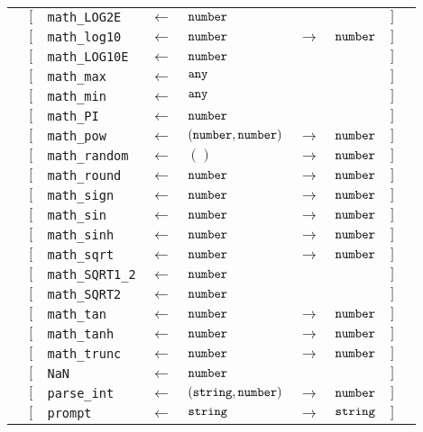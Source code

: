 \begin{tabular}[fragile]{lllllllll}
& $[$ & \texttt{math\_LOG2E} & $\leftarrow$  & $\texttt{number}$ & & & $]$ \\
& $[$ & \texttt{math\_log10} & $\leftarrow$  & $\texttt{number}$ & $\rightarrow$ & $\texttt{number}$ & $]$ \\
& $[$ & \texttt{math\_LOG10E} & $\leftarrow$  & $\texttt{number}$ & & & $]$ \\
& $[$ & \texttt{math\_max} & $\leftarrow$  & $\texttt{any}$ & & & $]$ \\
& $[$ & \texttt{math\_min} & $\leftarrow$  & $\texttt{any}$ & & & $]$ \\
& $[$ & \texttt{math\_PI} & $\leftarrow$  & $\texttt{number}$ & & & $]$ \\
& $[$ & \texttt{math\_pow} & $\leftarrow$  & $(\texttt{number}, \texttt{number})$ & $\rightarrow$ & $\texttt{number}$ & $]$ \\
& $[$ & \texttt{math\_random} & $\leftarrow$  & $()$ & $\rightarrow$ & $\texttt{number}$ & $]$ \\
& $[$ & \texttt{math\_round} & $\leftarrow$  & $\texttt{number}$ & $\rightarrow$ & $\texttt{number}$ & $]$ \\
& $[$ & \texttt{math\_sign} & $\leftarrow$  & $\texttt{number}$ & $\rightarrow$ & $\texttt{number}$ & $]$ \\
& $[$ & \texttt{math\_sin} & $\leftarrow$  & $\texttt{number}$ & $\rightarrow$ & $\texttt{number}$ & $]$ \\
& $[$ & \texttt{math\_sinh} & $\leftarrow$  & $\texttt{number}$ & $\rightarrow$ & $\texttt{number}$ & $]$ \\
& $[$ & \texttt{math\_sqrt} & $\leftarrow$  & $\texttt{number}$ & $\rightarrow$ & $\texttt{number}$ & $]$ \\
& $[$ & \texttt{math\_SQRT1\_2} & $\leftarrow$  & $\texttt{number}$ & & & $]$ \\
& $[$ & \texttt{math\_SQRT2} & $\leftarrow$  & $\texttt{number}$ & & & $]$ \\
& $[$ & \texttt{math\_tan} & $\leftarrow$  & $\texttt{number}$ & $\rightarrow$ & $\texttt{number}$ & $]$ \\
& $[$ & \texttt{math\_tanh} & $\leftarrow$  & $\texttt{number}$ & $\rightarrow$ & $\texttt{number}$ & $]$ \\
& $[$ & \texttt{math\_trunc} & $\leftarrow$  & $\texttt{number}$ & $\rightarrow$ & $\texttt{number}$ & $]$ \\
& $[$ & \texttt{NaN} & $\leftarrow$  & $\texttt{number}$ & & & $]$ \\
& $[$ & \texttt{parse\_int} & $\leftarrow$  & $(\texttt{string}, \texttt{number})$ & $\rightarrow$ & $\texttt{number}$ & $]$ \\
& $[$ & \texttt{prompt} & $\leftarrow$  & $\texttt{string}$ & $\rightarrow$ & $\texttt{string}$ & $]$ \\

\end{tabular}
